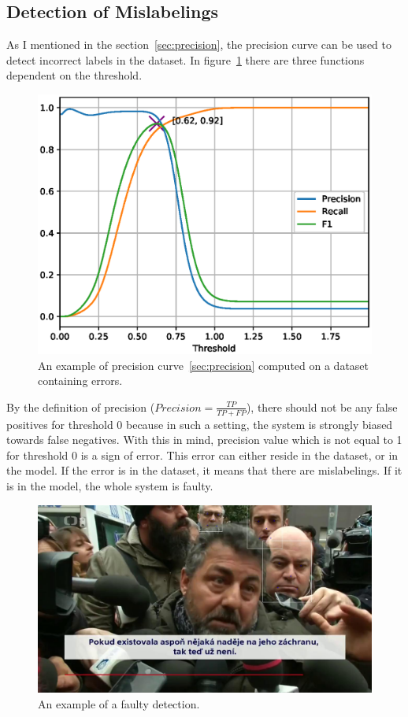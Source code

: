\subsection{Detection of Mislabelings}\label{subsec:detection-mislabelings}
As I mentioned in the section~\ref{sec:precision}, the precision curve can be used to detect incorrect labels in the
dataset.
In figure~\ref{fig:faulty_prft} there are three functions dependent on the threshold.

\begin{figure}[H]
    \centering
    \includegraphics[width=0.95\columnwidth]{images/implementation/faulty_prft.eps}
    \caption{An example of precision curve~\ref{sec:precision} computed on a dataset containing errors.}
    \label{fig:faulty_prft}
\end{figure}

By the definition of precision ($Precision = \frac{TP}{TP+FP}$), there should not be any false positives
for threshold 0 because in such a setting, the system is strongly biased towards false negatives.
With this in mind, precision value which is not equal to 1 for threshold 0 is a sign of error.
This error can either reside in the dataset, or in the model.
If the error is in the dataset, it means that there are mislabelings.
If it is in the model, the whole system is faulty.

\begin{figure}[H]
    \centering
    \includegraphics[width=0.9\columnwidth]{images/implementation/faulty_detection.jpg}
    \caption{An example of a faulty detection.}
    \label{fig:faulty_bbox}
\end{figure}

